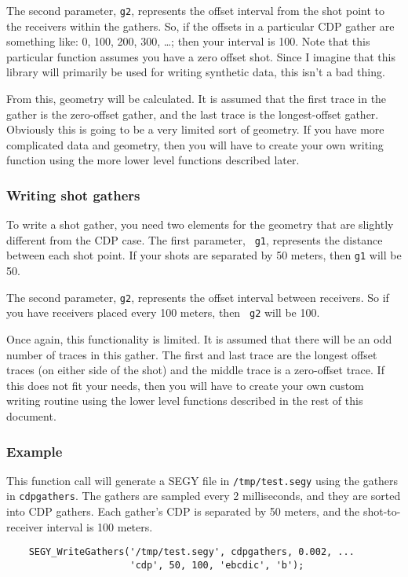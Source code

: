 \documentclass[10pt]{article}
\newcommand{\segy}{{\scriptsize SEGY}\xspace}
\newcommand{\cdp}{{\scriptsize CDP}\xspace}
\begin{document}
The second parameter, {\tt g2}, represents the offset interval from
the shot point to the receivers within the gathers. So, if the offsets
in a particular \cdp gather are something like: 0, 100, 200, 300,
\ldots; then your interval is 100. Note that this particular function
assumes you have a zero offset shot. Since I imagine that this library
will primarily be used for writing synthetic data, this isn't a bad
thing.

From this, geometry will be calculated. It is assumed that the first
trace in the gather is the zero-offset gather, and the last trace is
the longest-offset gather. Obviously this is going to be
a very limited sort of geometry. If you have more complicated data and
geometry, then you will have to create your own writing function using
the more lower level functions described later.

\subsubsection{Writing shot gathers}
To write a shot gather, you need two elements for the geometry that
are slightly different from the \cdp case. The first parameter, {\tt
  g1}, represents the distance between each shot point. If your shots
are separated by 50 meters, then {\tt g1} will be 50. 

The second parameter, {\tt g2}, represents the offset interval between
receivers. So if you have receivers placed every 100 meters, then {\tt
  g2} will be 100. 

Once again, this functionality is limited. It is assumed that there
will be an odd number of traces in this gather. The first and last
trace are the longest offset traces (on either side of the shot) and
the middle trace is a zero-offset trace. If this does not fit your
needs, then you will have to create your own custom writing routine
using the lower level functions described in the rest of this
document.

\subsubsection{Example}
This function call will generate a \segy file in {\tt /tmp/test.segy}
using the gathers in {\tt cdpgathers}. The gathers are sampled every 2
milliseconds, and they are sorted into \cdp gathers. Each gather's
\cdp is separated by 50 meters, and the shot-to-receiver interval is
100 meters.
\begin{verbatim}
    SEGY_WriteGathers('/tmp/test.segy', cdpgathers, 0.002, ...
                      'cdp', 50, 100, 'ebcdic', 'b');
\end{verbatim}
\end{document}
